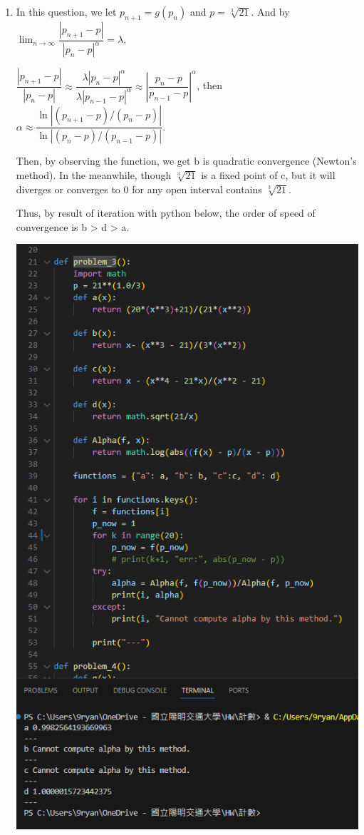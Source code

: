 \documentclass[12pt]{article}
\begin{document}
\begin{enumerate}
    \item In this question, we let $p_{n+1} = g(p_n)$ and $p = \sqrt[3]{21}$.
    And by $\displaystyle\lim_{n\to\infty} \dfrac{|p_{n+1} - p|}{|p_n - p|^\alpha} = \lambda$, 

    $\dfrac{|p_{n+1}-p|}{|p_n-p|} \approx \dfrac{\lambda |p_n-p|^\alpha}{\lambda |p_{n-1}-p|^\alpha} \approx \left|\dfrac{p_n - p}{p_{n-1}-p}\right|^\alpha$,
    then $\alpha \approx \dfrac{\ln |(p_{n+1} - p)/(p_n - p)|}{\ln |(p_n-p)/(p_{n-1}-p)|}$.
    
    Then, by observing the function, we get b is quadratic convergence (Newton's method).
    In the meanwhile, though $\sqrt[3]{21}$ is a fixed point of c, but it will diverges or converges to $0$ for any open interval contains $\sqrt[3]{21}$.

    Thus, by result of iteration with python below, the order of speed of convergence is b > d > a.

    \includegraphics[scale = 0.7]{2024-03-24-204951.png}


\end{enumerate}
\end{document}
